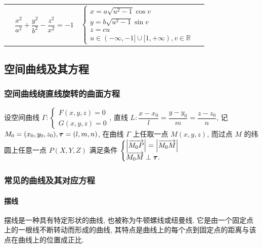 \begin{table}[H]
{\begin{tabular}{l c | l l}
\begin{minipage}[b]{0.3\columnwidth}
        \end{minipage} & $\dfrac{x^2}{a^2}+\dfrac{y^2}{b^2}-\dfrac{z^2}{x^2}=-1$ & $\begin{cases}
            x=a\sqrt{u^2-1}\cos v\\y=b\sqrt{u^2-1}\sin v\\z=cu\\u\in(-\infty,-1]\cup[1,+\infty),v\in\mathbb{R}
        \end{cases}$
    \end{tabular}
    }
\end{table}

\subsection{空间曲线及其方程}

\subsubsection{空间曲线绕直线旋转的曲面方程}

\begin{theorem}[空间曲线绕直线旋转的曲面方程]
    设空间曲线 $\Gamma:\begin{cases}
        F(x,y,z)=0\\
        G(x,y,z)=0
    \end{cases}$, 直线 $L:\dfrac{x-x_0}{l}=\dfrac{y-y_0}{m}=\dfrac{z-z_0}{n}$, 
    记 $M_0=(x_0,y_0,z_0),\vb*{\tau}=(l,m,n)$, 在曲线 $\Gamma$ 上任取一点 $M(x,y,z)$, 
    而过点 $M$ 的纬圆上任意一点 $P(X,Y,Z)$ 满足条件 $\begin{cases}
        \qty|\overrightarrow{M_0P}|=\qty|\overrightarrow{M_0M}|\\
        \overrightarrow{M_0M}\perp \vb*{\tau}.
    \end{cases}$
\end{theorem}

\subsubsection{常见的曲线及其对应方程}

\paragraph{摆线}

摆线是一种具有特定形状的曲线, 也被称为牛顿螺线或纽曼线. 
它是由一个固定点上的一根线不断转动而形成的曲线, 其特点是曲线上的每个点到固定点的距离与该点在曲线上的位置成正比. 

